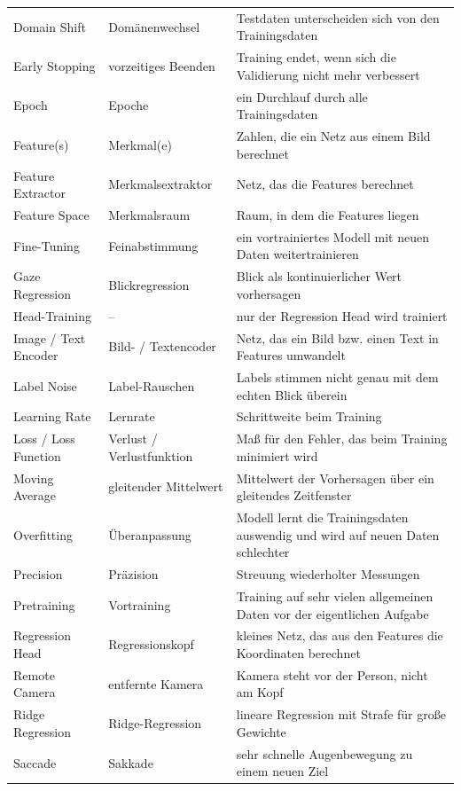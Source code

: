 {\begin{longtable}{@{}L{4.1cm}L{3.8cm}>{\raggedright\arraybackslash}p{\dimexpr\textwidth-7.9cm-4\tabcolsep\relax}@{}}
  Domain Shift & Domänenwechsel & Testdaten unterscheiden sich von den Trainingsdaten \\
  Early Stopping & vorzeitiges Beenden & Training endet, wenn sich die Validierung nicht mehr verbessert \\
  Epoch & Epoche & ein Durchlauf durch alle Trainingsdaten \\
  Feature(s) & Merkmal(e) & Zahlen, die ein Netz aus einem Bild berechnet \\
  Feature Extractor & Merkmalsextraktor & Netz, das die Features berechnet \\
  Feature Space & Merkmalsraum & Raum, in dem die Features liegen \\
  Fine-Tuning & Feinabstimmung & ein vortrainiertes Modell mit neuen Daten weitertrainieren \\
  Gaze Regression & Blickregression & Blick als kontinuierlicher Wert vorhersagen \\
  Head-Training & -- & nur der Regression Head wird trainiert \\
  Image / Text Encoder & Bild- / Textencoder & Netz, das ein Bild bzw. einen Text in Features umwandelt \\
  Label Noise & Label-Rauschen & Labels stimmen nicht genau mit dem echten Blick überein \\
  Learning Rate & Lernrate & Schrittweite beim Training \\
  Loss / Loss Function & Verlust / Verlustfunktion & Maß für den Fehler, das beim Training minimiert wird \\
  Moving Average & gleitender Mittelwert & Mittelwert der Vorhersagen über ein gleitendes Zeitfenster \\
  Overfitting & Überanpassung & Modell lernt die Trainingsdaten auswendig und wird auf neuen Daten schlechter \\
  Precision & Präzision & Streuung wiederholter Messungen \\
  Pretraining & Vortraining & Training auf sehr vielen allgemeinen Daten vor der eigentlichen Aufgabe \\
  Regression Head & Regressionskopf & kleines Netz, das aus den Features die Koordinaten berechnet \\
  Remote Camera & entfernte Kamera & Kamera steht vor der Person, nicht am Kopf \\
  Ridge Regression & Ridge-Regression & lineare Regression mit Strafe für große Gewichte \\
  Saccade & Sakkade & sehr schnelle Augenbewegung zu einem neuen Ziel \\

\end{longtable}}
